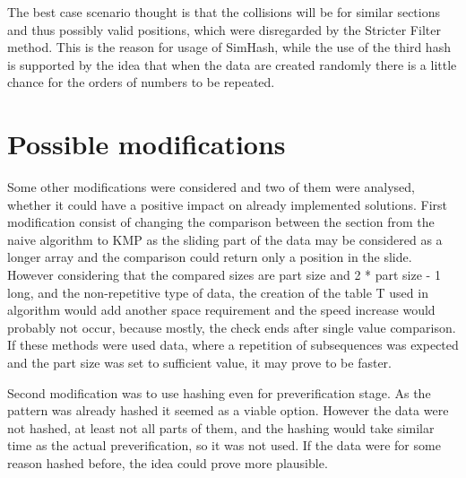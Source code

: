 The best case scenario thought is that the collisions will be for similar sections and thus possibly valid positions, which were disregarded by the Stricter Filter method. This is the reason for usage of SimHash, while the use of the third hash is supported by the idea that when the data are created randomly there is a little chance for the orders of numbers to be repeated.  


\section{Possible modifications}
Some other modifications were considered and two of them were analysed, whether it could have a positive impact on already implemented solutions. First modification consist of changing the comparison between the section from the naive algorithm to KMP as the sliding part of the data may be considered as a longer array and the comparison could return only a position in the slide. However considering that the compared sizes are part size and 2 * part size - 1 long, and the non-repetitive type of data, the creation of the table T used in algorithm would add another space requirement and the speed increase would probably not occur, because mostly, the check ends after single value comparison. If these methods were used data, where a repetition of subsequences was expected and the part size was set to sufficient value, it may prove to be faster.

Second modification was to use hashing even for preverification stage. As the pattern was already hashed it seemed as a viable option. However the data were not hashed, at least not all parts of them, and the hashing would take similar time as the actual preverification, so it was not used. If the data were for some reason hashed before, the idea could prove more plausible.
